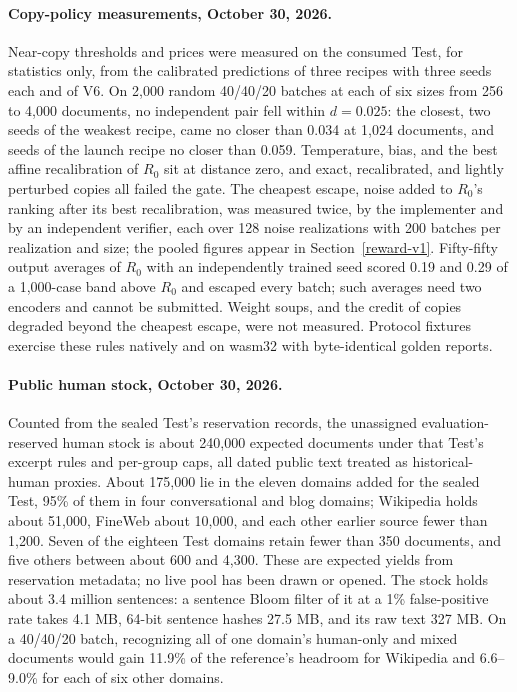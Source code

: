 \paragraph{Copy-policy measurements, October 30, 2026.}\label{copy-evidence}
Near-copy thresholds and prices were measured on the consumed Test, for
statistics only, from the calibrated predictions of three recipes with three
seeds each and of V6. On 2,000 random 40/40/20 batches at each of six sizes from
256 to 4,000 documents, no independent pair fell within \(d=0.025\): the
closest, two seeds of the weakest recipe, came no closer than 0.034 at 1,024
documents, and seeds of the launch recipe no closer than 0.059. Temperature,
bias, and the best affine recalibration of \(R_0\) sit at distance zero, and
exact, recalibrated, and lightly perturbed copies all failed the gate. The
cheapest escape, noise added to \(R_0\)'s ranking after its best recalibration,
was measured twice, by the implementer and by an independent verifier, each over
128 noise realizations with 200 batches per realization and size; the pooled
figures appear in Section~\ref{reward-v1}. Fifty-fifty output averages of
\(R_0\) with an independently trained seed scored 0.19 and 0.29 of a 1,000-case
band above \(R_0\) and escaped every batch; such averages need two encoders and
cannot be submitted. Weight soups, and the credit of copies degraded beyond the
cheapest escape, were not measured. Protocol fixtures exercise these
rules natively and on wasm32 with byte-identical golden reports.

\paragraph{Public human stock, October 30, 2026.}\label{human-evaluation-stock}
Counted from the sealed Test's reservation records, the unassigned
evaluation-reserved human stock is about 240,000 expected documents under that
Test's excerpt rules and per-group caps, all dated public text treated as
historical-human proxies. About 175,000 lie in the eleven domains added for the
sealed Test, 95\% of them in four conversational and blog domains; Wikipedia
holds about 51,000, FineWeb about 10,000, and each other earlier source fewer
than 1,200. Seven of the eighteen Test domains retain fewer than 350 documents,
and five others between about 600 and 4,300. These are expected yields from
reservation metadata; no live pool has been drawn or opened. The stock holds
about 3.4 million sentences: a sentence Bloom filter of it at a 1\%
false-positive rate takes 4.1 MB, 64-bit sentence hashes 27.5 MB, and its raw
text 327 MB. On a 40/40/20 batch, recognizing all of one domain's human-only and
mixed documents would gain 11.9\% of the reference's headroom for Wikipedia and
6.6--9.0\% for each of six other domains.

